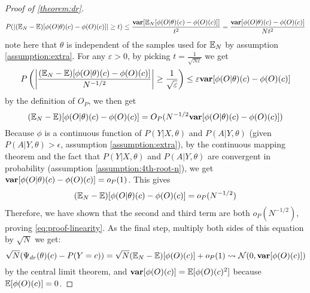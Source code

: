 \begin{proof}[Proof of \cref{theorem:dr}]
\begin{equation}
P(|(\mathbb{E}_N - \mathbb{E})[\phi(O|\theta)(c) - \phi(O)(c)]| \ge t) \le \frac{\textbf{var}[\mathbb{E}_N[\phi(O|\theta)(c) - \phi(O)(c)]]}{t^2} = \frac{\textbf{var}[\phi(O|\theta)(c) - \phi(O)(c)]}{Nt^2}
\end{equation}
note here that $\theta$ is independent of the samples used for $\mathbb{E}_N$ by assumption \ref{assumption:extra}. For any $\varepsilon > 0$, by picking $t = \frac{1}{\sqrt{N\varepsilon}}$ we get
\begin{equation}
P\left(\left|\frac{(\mathbb{E}_N - \mathbb{E})[\phi(O|\theta)(c) - \phi(O)(c)]}{N^{-1/2}}\right| \ge \frac{1}{\sqrt{\varepsilon}}\right) \le \varepsilon \textbf{var}[\phi(O|\theta)(c) - \phi(O)(c)]
\end{equation}
by the definition of $O_P$, we then get
\begin{equation}
(\mathbb{E}_N - \mathbb{E})[\phi(O|\theta)(c) - \phi(O)(c)] = O_P(N^{-1/2}\textbf{var}[\phi(O|\theta)(c) - \phi(O)(c)])
\end{equation}
Because $\phi$ is a continuous function of $P(Y|X,\theta)$ and $P(A|Y,\theta)$ (given $P(A|Y,\theta) > \epsilon$, assumption \ref{assumption:extra}), by the continuous mapping theorem and the fact that $P(Y|X,\theta)$ and $P(A|Y,\theta)$ are convergent in probability (assumption \ref{assumption:4th-root-n}), we get $\textbf{var}[\phi(O|\theta)(c) - \phi(O)(c)] = o_P(1)$. This gives
\begin{equation}
(\mathbb{E}_N - \mathbb{E})[\phi(O|\theta)(c) - \phi(O)(c)] = o_P(N^{-1/2})
\end{equation}
Therefore, we have shown that the second and third term are both $o_P(N^{-1/2})$, proving \cref{eq:proof-linearity}. As the final step, multiply both sides of this equation by $\sqrt{N}$ we get:
\begin{equation}
\sqrt{N}(\Psi_{dr}(\theta)(c) - P(Y=c)) = \sqrt{N} (\mathbb{E}_N - \mathbb{E})[\phi(O)(c)] + o_P(1) \rightsquigarrow \mathcal{N}(0, \textbf{var}[\phi(O)(c)])
\end{equation}
by the central limit theorem, and $\textbf{var}[\phi(O)(c)] = \mathbb{E}[\phi(O)(c)^2]$ because $\mathbb{E}[\phi(O)(c)] = 0$.
\end{proof}


